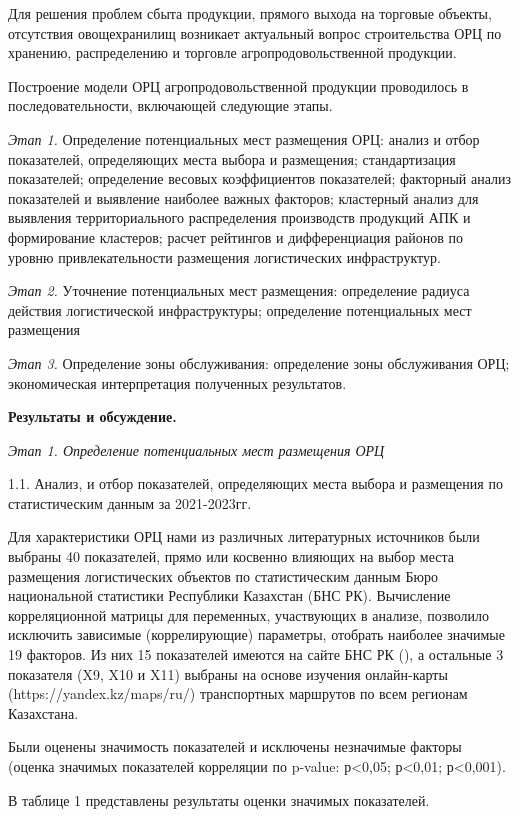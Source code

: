 \begin{multicols}{2}
Для решения проблем сбыта продукции, прямого выхода на торговые объекты,
отсутствия овощехранилищ возникает актуальный вопрос строительства ОРЦ
по хранению, распределению и торговле агропродовольственной продукции.~

Построение модели ОРЦ агропродовольственной продукции проводилось в
последовательности, включающей следующие этапы.

\emph{Этап 1.} Определение потенциальных мест размещения ОРЦ: анализ и
отбор показателей, определяющих места выбора и размещения;
стандартизация показателей; определение весовых коэффициентов
показателей; факторный анализ показателей и выявление наиболее важных
факторов; кластерный анализ для выявления территориального распределения
производств продукций АПК и формирование кластеров; расчет рейтингов и
дифференциация районов по уровню привлекательности размещения
логистических инфраструктур.

\emph{Этап 2.} Уточнение потенциальных мест размещения: определение
радиуса действия логистической инфраструктуры; определение потенциальных
мест размещения

\emph{Этап 3.} Определение зоны обслуживания: определение зоны
обслуживания ОРЦ; экономическая интерпретация полученных результатов.

{\bfseries Результаты и обсуждение.}

\emph{Этап 1. Определение потенциальных мест размещения ОРЦ}

1.1. Анализ, и отбор показателей, определяющих места выбора и размещения
по статистическим данным за 2021-2023гг.

Для характеристики ОРЦ нами из различных литературных источников были
выбраны 40 показателей, прямо или косвенно влияющих на выбор места
размещения логистических объектов по статистическим данным Бюро
национальной статистики Республики Казахстан (БНС РК). Вычисление
корреляционной матрицы для переменных, участвующих в анализе, позволило
исключить зависимые (коррелирующие) параметры, отобрать наиболее
значимые 19 факторов. Из них 15 показателей имеются на сайте БНС РК
(\href{https://stat.gov.kz/en/}{}), а
остальные 3 показателя (X9, X10 и X11) выбраны на основе изучения
онлайн-карты (https://yandex.kz/maps/ru/) транспортных маршрутов по всем
регионам Казахстана.

Были оценены значимость показателей и исключены незначимые факторы
(оценка значимых показателей корреляции по p-value: р\textless0,05;
р\textless0,01; р\textless0,001).

В таблице 1 представлены результаты оценки значимых показателей.
\end{multicols}
